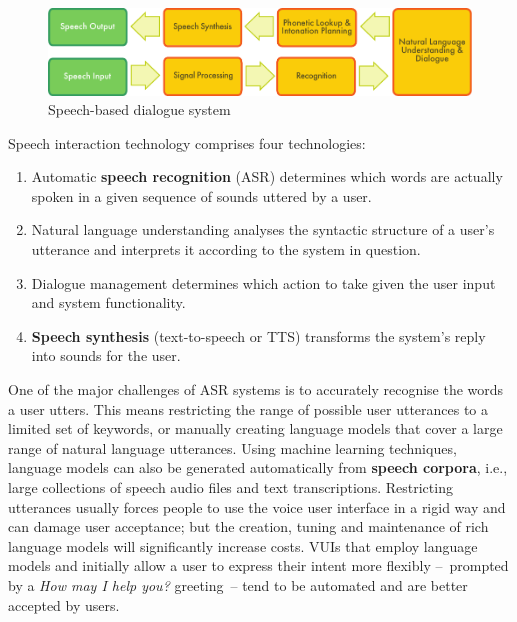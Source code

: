 \begin{multicols}{2}
\begin{figure}[htb]
  \center
  \includegraphics[width=\textwidth]{../_media/english/simple_speech-based_dialogue_architecture}
  \caption{Speech-based dialogue system}
  \label{fig:dialoguearch_en}
\end{figure}

Speech interaction technology comprises four technologies: 

\begin{enumerate}
\item Automatic \textbf{speech recognition} (ASR) determines which words are actually spoken in a given sequence of sounds uttered by a user.  
\item Natural language understanding analyses the syntactic structure of a user’s utterance and interprets it according to the system in question.
\item Dialogue management determines which action to take given the user input and system functionality.   
\item \textbf{Speech synthesis} (text-to-speech or TTS) trans\-forms the system’s reply into sounds for the user.
\end{enumerate}

One of the major challenges of ASR systems is to accurately recognise the words a user utters. This means restricting the range of possible user utterances to a limited set of keywords, or manually creating language models that cover a large range of natural language utterances. Using machine learning techniques, language models can also be generated automatically from \textbf{speech corpora}, i.e., large collections of speech audio files and text transcriptions. Restricting utterances usually forces people to use the voice user interface in a rigid way and can damage user acceptance; but the creation, tuning and maintenance of rich language models will significantly increase costs. VUIs that employ language models and initially allow a user to express their intent more flexibly --~prompted by a \textit{How may I help you?} greeting~-- tend to be automated and are better accepted by users.


\end{multicols}
